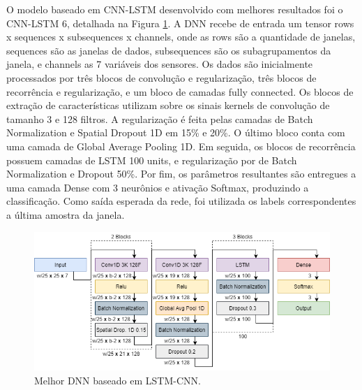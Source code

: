 O modelo baseado em CNN-LSTM desenvolvido com melhores resultados foi o CNN-LSTM 6, detalhada na Figura \ref{fig:cnn_lstm_dnn}. A DNN recebe de entrada um tensor rows x sequences x subsequences x channels, onde as rows são a quantidade de janelas, sequences são as janelas de dados, subsequences são os subagrupamentos da janela, e channels as 7 variáveis dos sensores. Os dados são inicialmente processados por três blocos de convolução e regularização, três blocos de recorrência e regularização, e um bloco de camadas fully connected. Os blocos de extração de características utilizam sobre os sinais kernels de convolução de tamanho 3 e 128 filtros. A regularização é feita pelas camadas de Batch Normalization e Spatial Dropout 1D em 15\% e 20\%. O último bloco conta com uma camada de Global Average Pooling 1D. Em seguida, os blocos de recorrência possuem camadas de LSTM 100 units, e regularização por de Batch Normalization e Dropout 50\%. Por fim, os parâmetros resultantes são entregues a uma camada Dense com 3 neurônios e ativação Softmax, produzindo a classificação. Como saída esperada da rede, foi utilizada os labels correspondentes a última amostra da janela.

\begin{figure}[h!]
  \centering
  \includegraphics[width=1\textwidth]{figuras/cnn_lstm_dnn.png}
  \caption{Melhor DNN baseado em LSTM-CNN.}
  \label{fig:cnn_lstm_dnn}
\end{figure}
